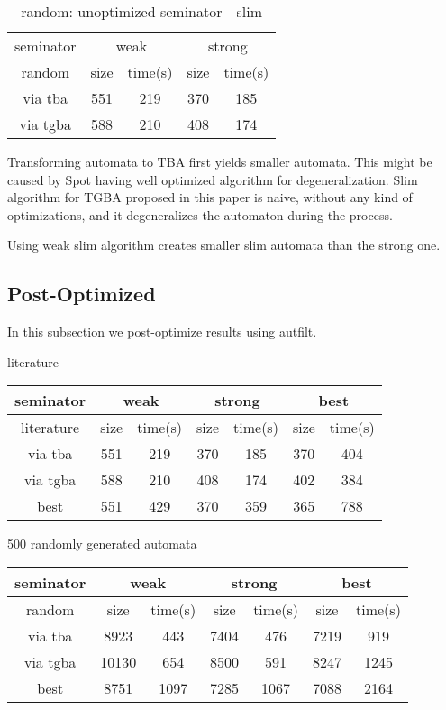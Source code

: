 \documentclass[
	digital
nolof, nolot
]{fithesis3}
\begin{document}
	
	\begin{table}[ht]
		\centering
		\caption{random: unoptimized seminator -\/-slim}
		\begin{tabular}{ |c||c|c|c|c| } 
			\hline
			seminator&\multicolumn{2}{c|}{weak}&\multicolumn{2}{c|}{strong} \\
			\hhline{|=====|}
			random&size&time(s)&size&time(s)\\
			\hline
			via tba&551&219& 370 &185\\
			\hline
			via tgba&588&210& 408&174\\ 
			\hline
		\end{tabular}
\end{table}
	
	
	Transforming automata to TBA first yields smaller automata. This might be caused by Spot having well optimized algorithm for degeneralization. Slim algorithm for TGBA proposed in this paper is naive, without any kind of optimizations, and it degeneralizes the automaton during the process.
	
	Using weak slim algorithm creates smaller slim automata than the strong one. 

	\subsection{Post-Optimized}
	In this subsection we post-optimize results using autfilt.
	
	literature
	\begin{center}
		\begin{tabular}{ |c||c|c|c|c|c|c| } 
			\hline
			seminator&\multicolumn{2}{c|}{weak}&\multicolumn{2}{c|}{strong}&\multicolumn{2}{c|}{best} \\
			\hline
			literature&size&time(s)&size&time(s)&size&time(s)\\
			\hhline{|=======|}
			
			via tba&551&219& 370 &185& 370&404\\
			\hline
			via tgba&588&210& 408&174& 402&384\\ 
			\hline
			best&551&429& 370&359& 365&788 \\ 
			\hline
		\end{tabular}
	\end{center}
	
	500 randomly generated automata
	\begin{center}
		\begin{tabular}{ |c|c|c|c|c|c|c| } 
			\hline
			seminator&\multicolumn{2}{c|}{weak}&\multicolumn{2}{c|}{strong}&\multicolumn{2}{c|}{best} \\
			\hline
			random&size&time(s)&size&time(s)&size&time(s)\\
			\hline
			via tba&8923&443& 7404 &476& 7219&919\\
			\hline
			via tgba&10130&654& 8500&591& 8247&1245\\ 
			\hline
			best&8751&1097& 7285&1067& 7088&2164 \\ 
			\hline
		\end{tabular}
	\end{center}
	
\end{document}
